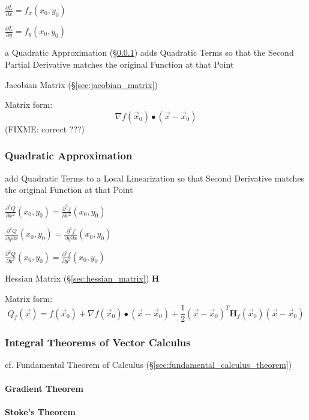 $\frac{\partial{L}}{\partial{x}} = f_x(x_0,y_0)$

$\frac{\partial{L}}{\partial{y}} = f_y(x_0,y_0)$

a Quadratic Approximation (\S\ref{sec:quadratic_approximation}) adds Quadratic
Terms so that the Second Partial Derivative matches the original Function at
that Point

\fist Jacobian Matrix (\S\ref{sec:jacobian_matrix})

Matrix form:
\[
  \nabla f(\vec{x}_0) \bullet (\vec{x}-\vec{x}_0)
\]
(FIXME: correct ???)



\subsubsection{Quadratic Approximation}\label{sec:quadratic_approximation}

add Quadratic Terms to a Local Linearization so that Second Derivative matches
the original Function at that Point

$\frac{\partial^2{Q}}{\partial{x^2}}(x_0,y_0) =
  \frac{\partial^2{f}}{\partial{x^2}}(x_0,y_0)$

$\frac{\partial^2{Q}}{\partial{y}\partial{x}}(x_0,y_0) =
  \frac{\partial^2{f}}{\partial{y}\partial{x}}(x_0,y_0)$

$\frac{\partial^2{Q}}{\partial{y^2}}(x_0,y_0) =
  \frac{\partial^2{f}}{\partial{y^2}}(x_0,y_0)$

\fist Hessian Matrix (\S\ref{sec:hessian_matrix}) $\mathbf{H}$

Matrix form:
\[
  Q_f(\vec{x}) = f(\vec{x}_0) + \nabla{f(\vec{x}_0)}\bullet (\vec{x}-\vec{x}_0)
  + \frac{1}{2}(\vec{x}-\vec{x}_0)^T\mathbf{H}_f(\vec{x}_0)(\vec{x}-\vec{x}_0)
\]



\subsubsection{Integral Theorems of Vector Calculus}
\label{sec:integral_theorems}

cf. Fundamental Theorem of Calculus (\S\ref{sec:fundamental_calculus_theorem})



\paragraph{Gradient Theorem}\label{sec:gradient_theorem}\hfill

\paragraph{Stoke's Theorem}\label{sec:stokes_theorem}\hfill

